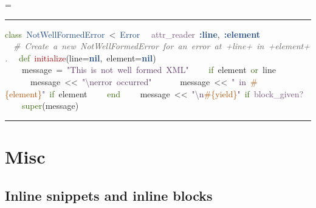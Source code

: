 \documentclass{article}
\makeatletter
\newcommand*{\ESHFontSize}{}
\newcommand*{\ESHFontFamily}{\ttfamily}
\newcommand*{\ESHBlockFontSize}{\ESHFontSize}
\newcommand*{\ESHBlockFontFamily}{\ESHFontFamily}
\newcommand*{\ESHBlockFont}{\ESHBlockFontSize\ESHBlockFontFamily}
\newcommand*{\ESHFallbackFontFamily}{\ESHFontFamily}
\newcommand*{\ESHFallbackFont}{\ESHFallbackFontFamily}
\newcommand*{\ESHNoHyphens}{\hyphenpenalty=10000}
\newcommand*{\ESHConstantSpace}{\spaceskip=\fontdimen2\font\xspaceskip=0pt}
\newcommand*{\ESHCenterInWidthOf}[2]
  {\settowidth\ESHtempdim{#1}%
   \makebox[\ESHtempdim][c]{#2}}
\newcommand*{\ESHIfFontChar}[1]
  {\iffontchar\font`#1{#1}\else{\ESHFallbackFont#1}\fi}
\def\ESHWithFallback#1{\ESHFallbackFont#1}}
\def\ESHWithFallback#1{\ESHIfFontChar{#1}}}}
\def\ESHWithFallback#1{%
     \ifnum\XeTeXfonttype\font>0%
       \ESHIfFontChar{#1}%
     \else%
       \setbox0=\hbox{\tracinglostchars=0\kern1sp#1\expandafter}%
       \ifnum\lastkern=1{\ESHFallbackFont#1}\else{#1}\fi
     \fi}}
\DeclareRobustCommand*{\ESHBlockSpecialChar}[1]
  {{\ESHCenterInWidthOf{\ESHBlockFontFamily{a}}{\ESHBlockFontFamily\ESHWithFallback{#1}}}}
\DeclareRobustCommand*{\ESHBlockUnicodeSubstitution}[1]
  {{\ESHCenterInWidthOf{\ESHBlockFontFamily{a}}{\ESHBlockFontFamily#1}}}
\DeclareRobustCommand*{\ESHInlineRaise}[2]
  {\raisebox{#1}{\relsize{-2}#2}}
\DeclareRobustCommand*{\ESHBlockRaise}[2]
  {\rlap{\ESHInlineRaise{#1}{#2}}\hphantom{#2}}
\newlength{\ESHBaselineskip}
\DeclareRobustCommand*{\ESHBlockStrut}[1]
  {\rule{0pt}{#1\ESHBaselineskip}}
\newcommand*{\ESHWeightBold}[1]{\textbf{#1}}
\newcommand*{\ESHBlockSlantItalic}[1]{{\itshape{#1}}} %
\newcommand*{\ESHNonbreakingSpace}{~}
\let\ESHSpecialChar\ignorespaces%
\let\ESHUnicodeSubstitution\ignorespaces%
\let\ESHRaise\ignorespaces%
\let\ESHBol\ignorespaces%
\let\ESHEol\ignorespaces%
\let\ESHSpace\ignorespaces%
\let\ESHDash\ignorespaces%
\let\ESHSlantItalic\ignorespaces%
\DeclareRobustCommand*{\ESHBlockInternalSetup}
  {\def\ESHSpecialChar{\ESHBlockSpecialChar}\def\ESHUnicodeSubstitution{\ESHBlockUnicodeSubstitution}%
   \def\ESHRaise{\ESHBlockRaise}\def\ESHSlantItalic{\ESHBlockSlantItalic}%
   \setlength{\ESHBaselineskip}{\baselineskip}\def\ESHStrut{\ESHBlockStrut}%
   \def\ESHBol{\-}\def\ESHEol{\newline}\def\ESHSpace{\ESHNonbreakingSpace}\def\ESHDash{\hbox{-}\nobreak}}
\newcommand*{\ESHBlockBasicSetup}
  {\setlength{\parindent}{0pt}\raggedright\ESHNoHyphens%
   \ESHBlockFont\ESHConstantSpace}
\newcommand*{\ESHHook}{}
\newcommand*{\ESHBlockHook}{\ESHHook}
\newlength{\ESHSkip}
\newcommand*{\ESHNoBreakAddVSpace}[1]{\addpenalty{\@M}\addvspace{#1}}
\newenvironment{ESHBlock}
  {\par\ESHNoBreakAddVSpace{\ESHSkip}\bgroup\ESHBlockInternalSetup\ESHBlockBasicSetup\ESHBlockHook}
  {\par\egroup\addvspace{\ESHSkip}}
\renewcommand{\ESHFontFamily}{\UbuntuMono}
\renewcommand{\ESHFallbackFontFamily}{\XITSMath}
\renewenvironment{ESHBlock}{%
  \par\ESHNoBreakAddVSpace{\ESHSkip}\bgroup\ESHBlockInternalSetup\ESHBlockBasicSetup%
  \hrule\addvspace{0.5em}%
}{%
  \par\egroup\addvspace{0.5em}\hrule\addvspace{2\ESHSkip}%
}
\makeatother
\begin{document}
\begin{ESHBlock}
\ESHBol{}\textcolor[HTML]{346604}{class}\ESHSpace{}\textcolor[HTML]{204A87}{NotWellFormedError}\ESHSpace{}{<}\ESHSpace{}\textcolor[HTML]{204A87}{Error}\ESHEol
\ESHBol{}\ESHSpace{}\ESHSpace{}\textcolor[HTML]{75507B}{attr\_reader}\ESHSpace{}\ESHWeightBold{\textcolor[HTML]{204A87}{:line}},\ESHSpace{}\ESHWeightBold{\textcolor[HTML]{204A87}{:element}}\ESHEol
\ESHBol{}\mbox{}\ESHEol
\ESHBol{}\ESHSpace{}\ESHSpace{}\ESHSlantItalic{\textcolor[HTML]{5F615C}{\#\ESHSpace{}Create\ESHSpace{}a\ESHSpace{}new\ESHSpace{}NotWellFormedError\ESHSpace{}for\ESHSpace{}an\ESHSpace{}error\ESHSpace{}at\ESHSpace{}+line+\ESHSpace{}in\ESHSpace{}+element+.}}\ESHEol
\ESHBol{}\ESHSpace{}\ESHSpace{}\textcolor[HTML]{346604}{def}\ESHSpace{}\textcolor[HTML]{A40000}{initialize}(line=\ESHWeightBold{\textcolor[HTML]{204A87}{nil}},\ESHSpace{}element=\ESHWeightBold{\textcolor[HTML]{204A87}{nil}})\ESHEol
\ESHBol{}\ESHSpace{}\ESHSpace{}\ESHSpace{}\ESHSpace{}message\ESHSpace{}=\ESHSpace{}\textcolor[HTML]{5C3566}{"This\ESHSpace{}is\ESHSpace{}not\ESHSpace{}well\ESHSpace{}formed\ESHSpace{}XML"}\ESHEol
\ESHBol{}\ESHSpace{}\ESHSpace{}\ESHSpace{}\ESHSpace{}\textcolor[HTML]{346604}{if}\ESHSpace{}element\ESHSpace{}\textcolor[HTML]{346604}{or}\ESHSpace{}line\ESHEol
\ESHBol{}\ESHSpace{}\ESHSpace{}\ESHSpace{}\ESHSpace{}\ESHSpace{}\ESHSpace{}message\ESHSpace{}{<}{<}\ESHSpace{}\textcolor[HTML]{5C3566}{"\textbackslash{}nerror\ESHSpace{}occurred"}\ESHEol
\ESHBol{}\ESHSpace{}\ESHSpace{}\ESHSpace{}\ESHSpace{}\ESHSpace{}\ESHSpace{}message\ESHSpace{}{<}{<}\ESHSpace{}\textcolor[HTML]{5C3566}{"\ESHSpace{}in\ESHSpace{}}\textcolor[HTML]{B35000}{\#\{element\}}\textcolor[HTML]{5C3566}{"}\ESHSpace{}\textcolor[HTML]{346604}{if}\ESHSpace{}element\ESHEol
\ESHBol{}\ESHSpace{}\ESHSpace{}\ESHSpace{}\ESHSpace{}\textcolor[HTML]{346604}{end}\ESHEol
\ESHBol{}\ESHSpace{}\ESHSpace{}\ESHSpace{}\ESHSpace{}message\ESHSpace{}{<}{<}\ESHSpace{}\textcolor[HTML]{5C3566}{"\textbackslash{}n}\textcolor[HTML]{B35000}{\#\{yield\}}\textcolor[HTML]{5C3566}{"}\ESHSpace{}\textcolor[HTML]{346604}{if}\ESHSpace{}\textcolor[HTML]{75507B}{block\_given?}\ESHEol
\ESHBol{}\ESHSpace{}\ESHSpace{}\ESHSpace{}\ESHSpace{}\textcolor[HTML]{346604}{super}(message)
\end{ESHBlock}

\section*{Misc}

\subsection*{Inline snippets and inline blocks}
\end{document}
